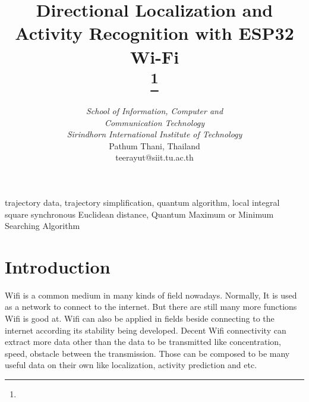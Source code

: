 \documentclass[conference]{IEEEtran}
\begin{document}
	
	\title{Directional Localization and Activity Recognition with ESP32 Wi-Fi \\
		{\footnotesize \textsuperscript{}}
		\thanks{}
	}
	
	\author{
		\and
		\IEEEauthorblockA
		{\textit{School of Information, Computer and}\\ \textit{Communication Technology} \\
			\textit{Sirindhorn International Institute of Technology}\\
			Pathum Thani, Thailand \\
			teerayut@siit.tu.ac.th}
	}
	
	
	
	
	
	
	\maketitle
	
	
	
	
	\begin{abstract}

		
	\end{abstract}
	
	\begin{IEEEkeywords}
		trajectory data, trajectory simplification, quantum algorithm, local integral square synchronous Euclidean distance, Quantum Maximum or Minimum Searching Algorithm
	\end{IEEEkeywords}
	
	\section{Introduction}
		 Wifi is a common medium in many kinds of field nowadays. Normally, It is used as a network to connect to the internet. But there are still many more functions Wifi is good at. Wifi can also be applied in fields beside connecting to the internet according its stability being developed. Decent Wifi connectivity can extract more data other than the data to be transmitted like concentration, speed, obstacle between the transmission. Those can be composed to be many useful data on their own like localization, activity prediction and  etc.
		 
\end{document}

